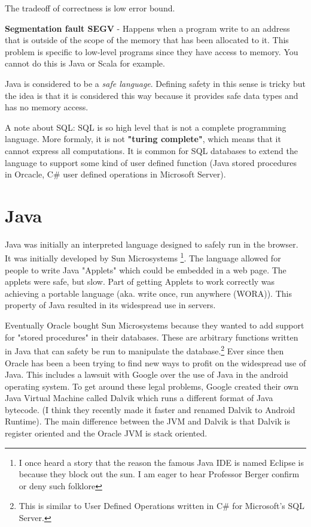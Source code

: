 \documentclass[twoside]{article}
\begin{document}
The tradeoff of correctness is low error bound. 

\textbf{Segmentation fault SEGV } - Happens when a program write to an address that is outside of the scope of the memory that has been allocated to it. This problem is specific to low-level programs since they have access to memory. You cannot do this is Java or Scala for example.

Java is considered to be a \textit{safe language}. Defining safety in this sense is tricky but the idea is that it is considered this way because it provides safe data types and has no memory access. 

A note about SQL: SQL is so high level that is not a complete programming language. More formaly, it is not \textbf{"turing complete"}, which means that it cannot express all computations. It is common for SQL databases to extend the language to support some kind of user defined function (Java stored procedures in Orcacle, C\# user defined operations in Microsoft Server). 

\section{Java}

Java was initially an interpreted language designed to safely run in the browser. It was initially developed by Sun Microsystems \footnote{I once heard a story that the reason the famous Java IDE is named Eclipse is because they block out the sun. I am eager to hear Professor Berger confirm or deny such folklore}. The language allowed for people to write Java "Applets" which could be embedded in a web page. The applets were safe, but slow. Part of getting Applets to work correctly was achieving a portable language (aka. write once, run anywhere (WORA)). This property of Java resulted in its widespread use in servers.

Eventually Oracle bought Sun Microsystems because they wanted to add support for "stored procedures" in their databases. These are arbitrary functions written in Java that can safety be run to manipulate the database.\footnote{This is similar to User Defined Operations written in C\# for Microsoft's SQL Server.} Ever since then Oracle has been a been trying to find new ways to profit on the widespread use of Java. This includes a lawsuit with Google over the use of Java in the android operating system. To get around these legal problems, Google created their own Java Virtual Machine called Dalvik which runs a different format of Java bytecode. (I think they recently made it faster and renamed Dalvik to Android Runtime). The main difference between the JVM and Dalvik is that Dalvik is register oriented and the Oracle JVM is stack oriented.
\end{document}
